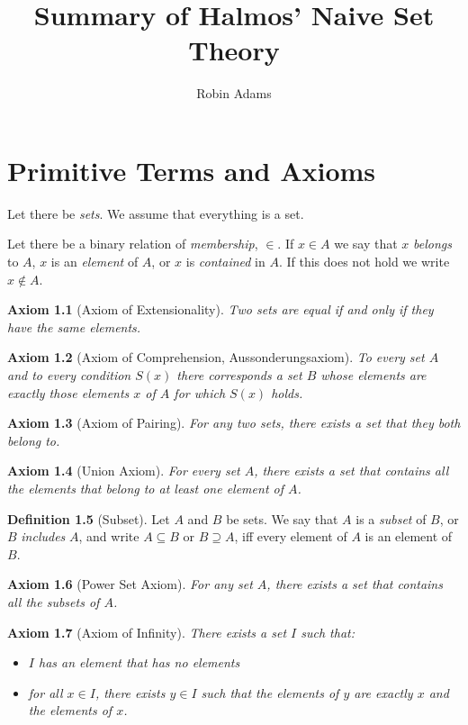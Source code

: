 \documentclass{report}
\title{Summary of Halmos' Naive Set Theory}
\author{Robin Adams}
\newtheorem{ax}{Axiom}[chapter]
\theoremstyle{definition}
\newtheorem{df}[ax]{Definition}
\begin{document}
\maketitle
\tableofcontents

\chapter{Primitive Terms and Axioms}

Let there be \emph{sets}. We assume that everything is a set.

Let there be a binary relation of \emph{membership}, $\in$. If $x \in A$ we say that $x$ \emph{belongs} to $A$, $x$ is an \emph{element} of $A$, or $x$ is \emph{contained} in $A$. If this does not hold we write $x \notin A$.

\begin{ax}[Axiom of Extensionality]
Two sets are equal if and only if they have the same elements.
\end{ax}

\begin{ax}[Axiom of Comprehension, Aussonderungsaxiom]
To every set $A$ and to every condition $S(x)$ there corresponds a set $B$ whose elements are exactly those elements $x$ of $A$ for which $S(x)$ holds.
\end{ax}

\begin{ax}[Axiom of Pairing]
For any two sets, there exists a set that they both belong to.
\end{ax}

\begin{ax}[Union Axiom]
For every set $A$, there exists a set that contains all the elements that belong to at least one element of $A$.
\end{ax}

\begin{df}[Subset]
Let $A$ and $B$ be sets. We say that $A$ is a \emph{subset} of $B$, or $B$ \emph{includes} $A$, and write $A \subseteq B$ or $B \supseteq A$, iff every element of $A$ is an element of $B$.
\end{df}

\begin{ax}[Power Set Axiom]
For any set $A$, there exists a set that contains all the subsets of $A$.
\end{ax}

\begin{ax}[Axiom of Infinity]
There exists a set $I$ such that:
\begin{itemize}
\item $I$ has an element that has no elements
\item for all $x \in I$, there exists $y \in I$ such that the elements of $y$ are exactly $x$ and the elements of $x$.
\end{itemize}
\end{ax}
\end{document}
